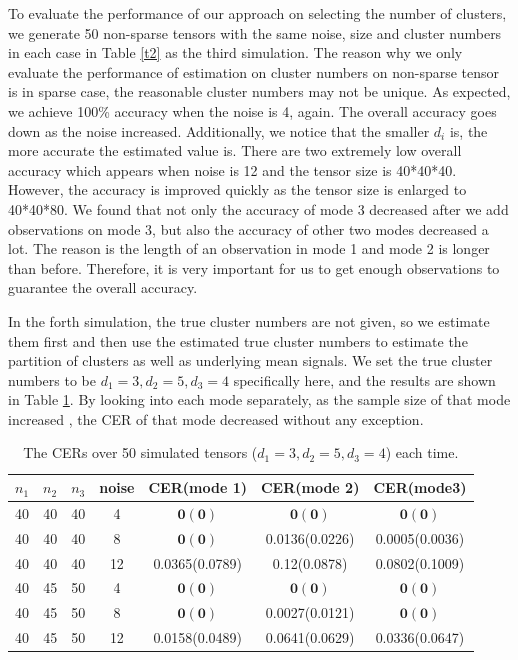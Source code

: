 \documentclass{article}
\begin{document}
To evaluate the performance of our approach on selecting the number of clusters, we generate 50 non-sparse tensors with the same noise, size and cluster numbers in each case in Table \ref{t2} as the third simulation.  The reason why we only evaluate the performance of estimation on cluster numbers on non-sparse tensor is in sparse case, the reasonable cluster numbers may not be unique. As expected, we achieve 100\% accuracy when the noise is 4, again. The overall accuracy goes down as the noise increased. Additionally, we notice that the smaller $d_i$ is, the more accurate the estimated value is. There are two extremely low overall accuracy which appears when noise is 12 and the tensor size is 40*40*40. However, the accuracy is improved quickly as the tensor size is enlarged to 40*40*80. We found that not only the accuracy of mode 3 decreased after we add observations on mode 3, but also the accuracy of other two modes decreased a lot. The reason is the length of an observation in mode 1 and mode 2 is longer than before. Therefore, it is very important for us to get enough observations to guarantee the overall accuracy.\par

In the forth simulation, the true cluster numbers are not given, so we estimate them first and then use the estimated true cluster numbers to estimate the partition of clusters as well as underlying mean signals. We set the true cluster numbers to be $d_1=3, d_2=5, d_3=4$ specifically here, and the results are shown in Table \ref{t3}. By looking into each mode separately, as the sample size of that mode increased , the CER of that mode decreased without any exception.\par  
\begin{table}
	\centering
	\begin{tabular}{|c|c|c|c|c|c|c|}
		\hline
		$n_1$&$n_2$&$n_3$&noise&CER(mode 1)&CER(mode 2)&CER(mode3)\\ \hline
		40&40&40&4&$\mathbf{0(0)}$&$\mathbf{0(0)}$&$\mathbf{0(0)}$\\
		40&40&40&8&$\mathbf{0(0)}$&0.0136(0.0226)&0.0005(0.0036) \\
		40&40&40&12&0.0365(0.0789)&0.12(0.0878)&0.0802(0.1009)\\
		40&45&50&4&$\mathbf{0(0)}$&$\mathbf{0(0)}$&$\mathbf{0(0)}$\\
		40&45&50&8&$\mathbf{0(0)}$&0.0027(0.0121)&$\mathbf{0(0)}$\\
		40&45&50&12&0.0158(0.0489)&0.0641(0.0629)&0.0336(0.0647)\\
		\hline
	\end{tabular}
	\caption{The CERs over 50 simulated tensors ($d_1=3, d_2=5, d_3=4$) each time.}
	\label{t3}
\end{table}
\end{document}
